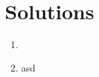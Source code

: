 \documentclass{article}
\begin{document}

\section*{Solutions}
\begin{enumerate}
    \item 
    \item asd
\end{enumerate}
\end{document}
